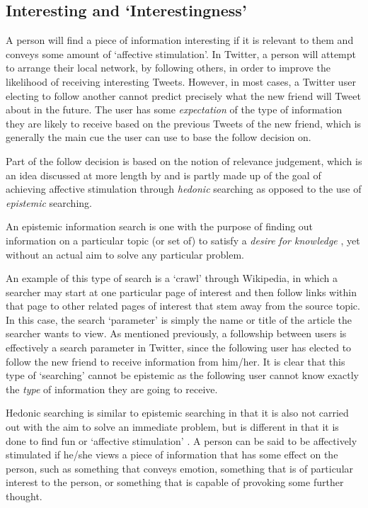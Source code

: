 \subsection{Interesting and `Interestingness'}
A person will find a piece of information interesting if it is relevant to them and conveys some amount of `affective stimulation'. In Twitter, a person will attempt to arrange their local network, by following others, in order to improve the likelihood of receiving interesting Tweets. However, in most cases, a Twitter user electing to follow another cannot predict precisely what the new friend will Tweet about in the future. The user has some \textit{expectation} of the type of information they are likely to receive based on the previous Tweets of the new friend, which is generally the main cue the user can use to base the follow decision on.

Part of the follow decision is based on the notion of relevance judgement, which is an idea discussed at more length by \citet{xu07} and is partly made up of the goal of achieving affective stimulation through \textit{hedonic} searching as opposed to the use of \textit{epistemic} searching.

An epistemic information search is one with the purpose of finding out information on a particular topic (or set of) to satisfy a \textit{desire for knowledge} \cite{xu07}, yet without an actual aim to solve any particular problem.

An example of this type of search is a `crawl' through Wikipedia, in which a searcher may start at one particular page of interest and then follow links within that page to other related pages of interest that stem away from the source topic. In this case, the search `parameter' is simply the name or title of the article the searcher wants to view. As mentioned previously, a followship between users is effectively a search parameter in Twitter, since the following user has elected to follow the new friend to receive information from him/her. It is clear that this type of `searching' cannot be epistemic as the following user cannot know exactly the \textit{type} of information they are going to receive.

Hedonic searching is similar to epistemic searching in that it is also not carried out with the aim to solve an immediate problem, but is different in that it is done to find fun or `affective stimulation' \cite{xu07}. A person can be said to be affectively stimulated if he/she views a piece of information that has some effect on the person, such as something that conveys emotion, something that is of particular interest to the person, or something that is capable of provoking some further thought.

